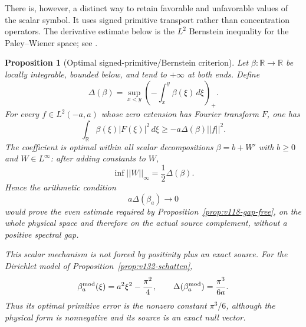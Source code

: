 \documentclass[11pt]{article}
\def\norm#1{||#1||}%
\newtheorem{proposition}[theorem]{Proposition}
\theoremstyle{remark}
\newcommand{\norm}[1]{\left\lVert #1\right\rVert}
\begin{document}
There is, however, a distinct way to retain favorable and unfavorable
values of the scalar symbol.  It uses signed primitive transport rather
than concentration operators.  The derivative estimate below is the
$L^2$ Bernstein inequality for the Paley--Wiener space; see
\cite{Bang1995}.

\begin{proposition}[Optimal signed-primitive/Bernstein criterion]
\label{prop:v134-primitive}
Let $\beta:\mathbb R\to\mathbb R$ be locally integrable, bounded below,
and tend to $+\infty$ at both ends.  Define
\begin{equation}
 \Delta(\beta)=
 \sup_{x<y}\left(-\int_x^y\beta(\xi)\,d\xi\right)_+ .
 \label{eq:v134-drawdown}
\end{equation}
For every $f\in L^2(-a,a)$ whose zero extension has Fourier transform
$F$, one has
\begin{equation}
 \int_{\mathbb R}\beta(\xi)|F(\xi)|^2\,d\xi
 \ge-a\Delta(\beta)\norm f^2.                 \label{eq:v134-primitive-bound}
\end{equation}
The coefficient is optimal within all scalar decompositions
$\beta=b+W'$ with $b\ge0$ and $W\in L^\infty$: after adding constants
to $W$,
\begin{equation}
 \inf\norm W_\infty=\frac12\Delta(\beta).     \label{eq:v134-optimal}
\end{equation}
Hence the arithmetic condition
\begin{equation}
 a\Delta(\beta_a)\longrightarrow0             \label{eq:v134-open-lemma}
\end{equation}
would prove the even estimate required by
Proposition~\ref{prop:v118-gap-free}, on the whole physical space and
therefore on the actual source complement, without a positive spectral
gap.

This scalar mechanism is not forced by positivity plus an exact source.
For the Dirichlet model of Proposition~\ref{prop:v132-schatten},
\[
 \beta_a^{\rm mod}(\xi)=a^2\xi^2-\frac{\pi^2}{4},
 \qquad
 \Delta(\beta_a^{\rm mod})=\frac{\pi^3}{6a}.
\]
Thus its optimal primitive error is the nonzero constant $\pi^3/6$,
although the physical form is nonnegative and its source is an exact
null vector.
\end{proposition}
\end{document}
